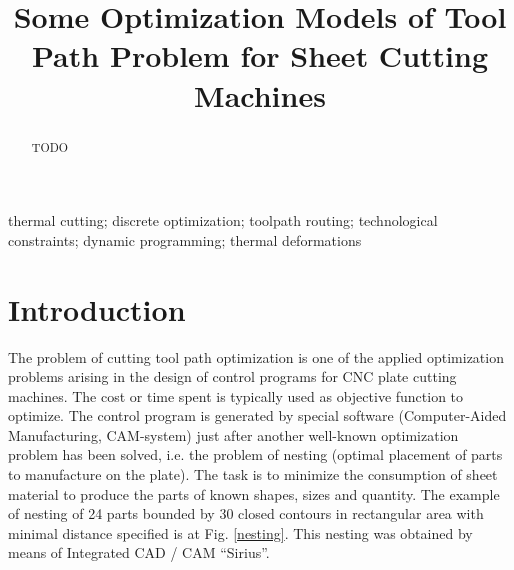 \documentclass{../download/tPRS2e}
\begin{document}
\title{Some Optimization Models of Tool Path Problem for Sheet Cutting Machines}

\author{
}

\maketitle

\begin{abstract}
TODO
\end{abstract}

\begin{keywords}
    thermal cutting;
    discrete optimization;
    toolpath routing;
    technological constraints;
    dynamic programming;
    thermal deformations
\end{keywords}

\section{Introduction}

The problem of cutting tool path optimization
is one of the applied optimization problems arising
in the design of control programs for CNC plate cutting machines.
The cost or time spent is typically used
as objective function to optimize.
The control program is generated by special software 
(Computer-Aided Manufacturing, CAM-system)
just after another well-known optimization problem
has been solved,
i.e. the problem of nesting
(optimal placement of parts to manufacture on the plate).
The task is to minimize the consumption of sheet material
to produce the parts of known shapes, sizes and quantity.
The example of nesting of 24 parts bounded by 30 closed contours
in rectangular area with minimal distance specified is at Fig. \ref{nesting}.
This nesting was obtained by means of Integrated CAD / CAM ``Sirius''.
\end{document}
